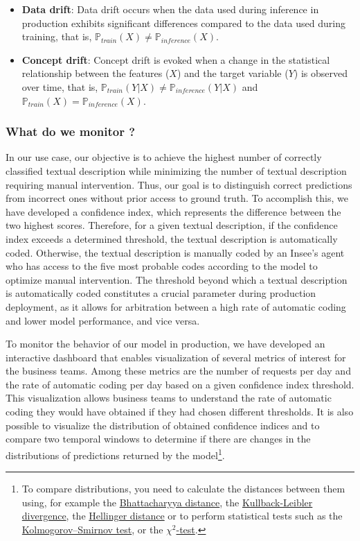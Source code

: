 \begin{itemize}
    \item \textbf{Data drift}: Data drift occurs when the data used during inference in production exhibits significant differences compared to the data used during training, that is,  $\mathds{P}_{train}(X) \neq \mathds{P}_{inference}(X)$.
    \item \textbf{Concept drift}: Concept drift is evoked when a change in the statistical relationship between the features ($X$) and the target variable ($Y$) is observed over time, that is, $\mathds{P}_{train}(Y|X) \neq \mathds{P}_{inference}(Y|X)$ and $\mathds{P}_{train}(X) = \mathds{P}_{inference}(X)$.
\end{itemize}


\subsubsection{What do we monitor ?}

In our use case, our objective is to achieve the highest number of correctly classified textual description while minimizing the number of textual description requiring manual intervention. Thus, our goal is to distinguish correct predictions from incorrect ones without prior access to ground truth. To accomplish this, we have developed a confidence index, which represents the difference between the two highest scores. Therefore, for a given textual description, if the confidence index exceeds a determined threshold, the textual description is automatically coded. Otherwise, the textual description is manually coded by an Insee's agent who has access to the five most probable codes according to the model to optimize manual intervention. The threshold beyond which a textual description is automatically coded constitutes a crucial parameter during production deployment, as it allows for arbitration between a high rate of automatic coding and lower model performance, and vice versa.

To monitor the behavior of our model in production, we have developed an interactive dashboard that enables visualization of several metrics of interest for the business teams. Among these metrics are the number of requests per day and the rate of automatic coding per day based on a given confidence index threshold. This visualization allows business teams to understand the rate of automatic coding they would have obtained if they had chosen different thresholds. It is also possible to visualize the distribution of obtained confidence indices and to compare two temporal windows to determine if there are changes in the distributions of predictions returned by the model\footnote{To compare distributions, you need to calculate the distances between them using, for example the \href{https://en.wikipedia.org/wiki/Bhattacharyya_distance}{Bhattacharyya distance}, the \href{https://en.wikipedia.org/wiki/Kullback\%E2\%80\%93Leibler_divergence}{Kullback-Leibler divergence}, the \href{https://en.wikipedia.org/wiki/Hellinger_distance}{Hellinger distance} or to perform statistical tests such as the \href{https://en.wikipedia.org/wiki/Kolmogorov\%E2\%80\%93Smirnov_test}{Kolmogorov–Smirnov test}, or the \href{https://en.wikipedia.org/wiki/Chi-squared_test}{$\chi^2$-test}.}. 

